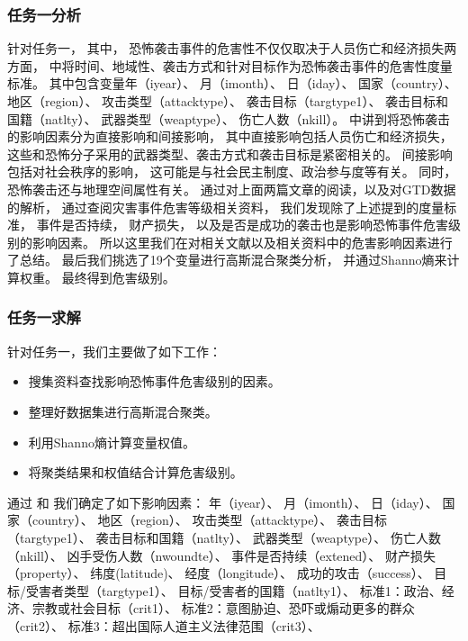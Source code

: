 \documentclass[bwprint]{gmcmthesis}
\begin{document}
\subsubsection{任务一分析}

针对任务一，
其中，
恐怖袭击事件的危害性不仅仅取决于人员伤亡和经济损失两方面，
\cite{贺怀清2012恐怖袭击事件不确定性度量及可视分析}
中将时间、地域性、袭击方式和针对目标作为恐怖袭击事件的危害性度量标准。
其中包含变量年（iyear）、
月（imonth）、
日（iday）、
国家（country）、
地区（region）、
攻击类型（attacktype）、
袭击目标（targtype1）、
袭击目标和国籍（natlty）、
武器类型（weaptype）、
伤亡人数（nkill）。
\cite{李国辉2014全球恐怖袭击时空演变及风险分析研究}
中讲到将恐怖袭击的影响因素分为直接影响和间接影响，
其中直接影响包括人员伤亡和经济损失，
这些和恐怖分子采用的武器类型、袭击方式和袭击目标是紧密相关的。
间接影响包括对社会秩序的影响，
这可能是与社会民主制度、政治参与度等有关。
同时，恐怖袭击还与地理空间属性有关。
通过对上面两篇文章的阅读，以及对GTD数据的解析，
通过查阅灾害事件危害等级相关资料，
我们发现除了上述提到的度量标准，
事件是否持续，
财产损失，
以及是否是成功的袭击也是影响恐怖事件危害级别的影响因素。
所以这里我们在对相关文献以及相关资料中的危害影响因素进行了总结。
最后我们挑选了19个变量进行高斯混合聚类分析，
并通过Shanno熵来计算权重。
最终得到危害级别。

\subsubsection{任务一求解}

针对任务一，我们主要做了如下工作：
\begin{itemize}
  \item 搜集资料查找影响恐怖事件危害级别的因素。
  \item 整理好数据集进行高斯混合聚类。
  \item 利用Shanno熵计算变量权值。
  \item 将聚类结果和权值结合计算危害级别。
\end{itemize}

通过\cite{贺怀清2012恐怖袭击事件不确定性度量及可视分析}
和\cite{李国辉2014全球恐怖袭击时空演变及风险分析研究}
我们确定了如下影响因素：
年（iyear）、
月（imonth）、
日（iday）、
国家（country）、
地区（region）、
攻击类型（attacktype）、
袭击目标（targtype1）、
袭击目标和国籍（natlty）、
武器类型（weaptype）、
伤亡人数（nkill）、
凶手受伤人数（nwoundte）、
事件是否持续（extened）、
财产损失（property）、
纬度(latitude)、
经度（longitude）、
成功的攻击（success）、
目标/受害者类型（targtype1）、
目标/受害者的国籍（natlty1）、
标准1：政治、经济、宗教或社会目标（crit1）、
标准2：意图胁迫、恐吓或煽动更多的群众（crit2）、
标准3：超出国际人道主义法律范围（crit3）、
\end{document}
